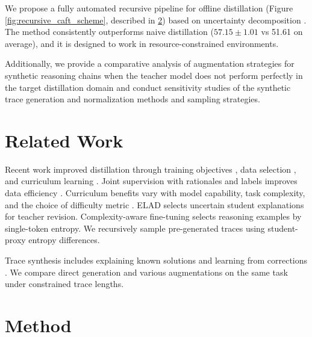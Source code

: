 \documentclass[11pt]{article}
\begin{document}
We propose a fully automated recursive pipeline for offline distillation (Figure \ref{fig:recursive_caft_scheme}, described in \ref{sec:method}) based on uncertainty decomposition \citep{wang2025aleatoricepistemicexploringuncertainty}. The method consistently outperforms naive distillation ($57.15 \pm 1.01$ vs 51.61 on average), and it is designed to work in resource-constrained environments.

Additionally, we provide a comparative analysis of augmentation strategies for synthetic reasoning chains when the teacher model does not perform perfectly in the target distillation domain and conduct sensitivity studies of the synthetic trace generation and normalization methods and sampling strategies.

\section{Related Work}

Recent work improved distillation through training objectives \citep{pmlr-v235-ko24c,xu-etal-2026-harnessing}, data selection \citep{pmlr-v306-just26a,li2025naturalthoughtsselectingdistillingreasoning,yang-etal-2026-select2reason}, and curriculum learning \citep{jiang-etal-2025-teach,zhang-liu-2026-calibrated}.
Joint supervision with rationales and labels improves data efficiency \citep{hsieh-etal-2023-distilling}.
Curriculum benefits vary with model capability, task complexity, and the choice of difficulty metric \citep{jia-etal-2026-makes}.
ELAD \citep{zhang-etal-2024-elad} selects uncertain student explanations for teacher revision.
Complexity-aware fine-tuning \citep{goncharov2026complexityawarefinetuning} selects reasoning examples by single-token entropy.
We recursively sample pre-generated traces using student-proxy entropy differences.

Trace synthesis includes explaining known solutions \citep{li2024distillingalgorithmicreasoning,wang2025reverseengineeredreasoningopenendedgeneration} and learning from corrections \citep{an2024learningmistakesmakesllm, ICLR2025_0967d7c8}.
We compare direct generation and various augmentations on the same task under constrained trace lengths.

\section{Method}
\label{sec:method}
\end{document}
